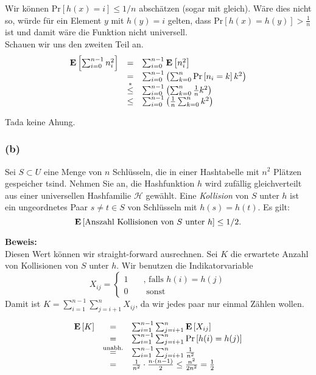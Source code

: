 \documentclass[11pt,a4paper,ngerman]{article}
\newcommand{\erw}[1]{\text{\bfseries E} \left[ #1 \right]}
\newcommand{\prob}[1]{\text{Pr}\left[ #1 \right]}
\begin{document}
Wir können $\prob{h(x)=i} \leq 1 / n$ abschätzen (sogar mit gleich). Wäre dies nicht so, würde für ein Element $y$ mit $h(y) = i$ gelten, dass
$\prob{h(x) = h(y)} > \frac{1}{n}$ ist und damit wäre die Funktion nicht universell.\\

Schauen wir uns den zweiten Teil an.
$$\begin{array}{rcl}
	\erw{\sum_{i=0}^{n-1} n_i^2} &=& \sum_{i=0}^{n-1} \erw{n_i^2}\\
				&=& \sum_{i=0}^{n-1} \left( \sum_{k=0}^n \prob{n_i = k} k^2 \right)\\
				&\stackrel{*}{\leq}& \sum_{i=0}^{n-1} \left( \sum_{k=0}^n \frac{1}{n} k^2 \right)\\
				&\leq& \sum_{i=0}^{n-1} \left( \frac{1}{n}  \sum_{k=0}^n k^2\right)\\
\end{array}$$

Tada keine Ahung.

\subsubsection*{(b)}
Sei $S \subset U$ eine Menge von $n$ Schlüsseln, die in einer Hashtabelle mit $n^2$ Plätzen gespeicher tsind. Nehmen Sie an, die Hashfunktion $h$ wird zufällig gleichverteilt aus einer universellen Hashfamilie $\mathcal{H}$ gewählt. Eine \emph{Kollision} von $S$ unter $h$ ist ein ungeordnetes Paar $s \not= t \in S$ von Schlüsseln mit $h(s) = h(t)$. Es gilt:
$$
	\erw{\text{Anszahl Kollisionen von }S\text{ unter }h} \leq 1 / 2 .
$$

\noindent\textbf{Beweis:}\\
Diesen Wert können wir straight-forward ausrechnen. Sei $K$ die erwartete Anzahl von Kollisionen von $S$ unter $h$.
Wir benutzen die Indikatorvariable
$$
	X_{ij} = \left\{ \begin{array}{rl} 1 \quad &\text{, falls }h(i) = h(j)\\ 0 &\text{ sonst} \end{array}\right.
$$
Damit ist $K = \sum_{i=1}^{n-1}\sum_{j=i+1}^n X_{ij}$, da wir jedes paar nur einmal Zählen wollen.

$$\begin{array}{rcl}
	\erw{K} &=& \sum_{i=1}^{n-1}\sum_{j=i+1}^n \erw{X_{ij}}\\
		&=& \sum_{i=1}^{n-1}\sum_{j=i+1}^n \prob{h(i)=h(j)}\\
		   &\stackrel{\text{unabh.}}{=}& \sum_{i=1}^{n-1} \sum_{j=i+1}^n \frac{1}{n^2}\\
		  &=& \frac{1}{n^2} \cdot \frac{n\cdot (n-1)}{2} \leq \frac{n^2}{2n^2} = \frac{1}{2}
\end{array}$$
\end{document}
